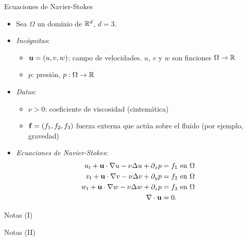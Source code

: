 \documentclass[9pt]{beamer}
\newcommand{\matcolbox}[2][red]{\fcolorbox{#1}{white}{$\!#2\!$}}
\newcommand{\altbox}[2]{
  #2
    }
\begin{document}
\begin{frame}{Ecuaciones de Navier-Stokes}
  \begin{itemize}
  \item Sea $\Omega$ un dominio de ${\mathbb R}^d$, $d=3$.
  \item \emph{Incógnitas}:
  \begin{itemize}
      \item $\mathbf{u}=(u,v,w)$: campo de velocidades. $u$, $v$ y $w$ son finciones $\Omega \to {\mathbb R}$
      \item $p$: presión, $p:\Omega \to {\mathbb R}$
  \end{itemize}
  \item \emph{Datos}:
  \begin{itemize}
    \item $\nu>0$: coeficiente de viscosidad (cintemática)
      \item $\mathbf{f}=(f_1,f_2,f_3)$ fuerza externa que actúa sobre el fluido (por ejemplo, gravedad)
  \end{itemize}
  \item \emph{Ecuaciones de Navier-Stokes}:
  \begin{align}
    \altbox1{u_t}
    +
    \altbox2{\uu\cdot\grad u}
    - \nu
    \altbox3{\Delta u}
    + \dx p &= f_1 \text{ en } \Omega
    \\
    v_t + \uu\cdot\grad v - \nu\Delta v + \dy p &= f_2 \text{ en } \Omega
    \\
    w_t + \uu\cdot\grad w - \nu\Delta w + \dz p &= f_3 \text{ en } \Omega
    \\
    \div{\uu} &= 0.
  \end{align}
  \end{itemize}
  \vfill
\end{frame}

\begin{frame}{Notas (I)}

\end{frame}

\begin{frame}{Notas (II)}

\end{frame}
\end{document}

